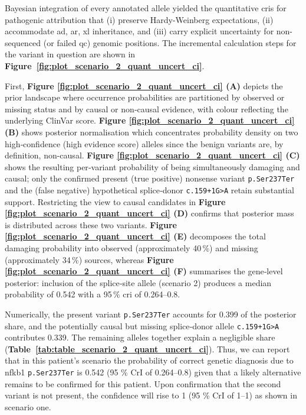 Bayesian integration of every annotated allele yielded the quantitative \ac{cri}s for pathogenic attribution that (i) preserve Hardy-Weinberg expectations, (ii) accommodate \ac{ad}, \ac{ar}, \ac{xl} inheritance, and (iii) carry explicit uncertainty for non-sequenced (or failed \ac{qc}) genomic positions.  
The incremental calculation steps for the variant in question are shown in \textbf{Figure~\ref{fig:plot_scenario_2_quant_uncert_ci}}.

First, \textbf{Figure \ref{fig:plot_scenario_2_quant_uncert_ci} (A)}
depicts the prior landscape where occurrence probabilities are partitioned by observed or missing status and by causal or non‑causal evidence, with colour reflecting the underlying ClinVar score.  
\textbf{Figure \ref{fig:plot_scenario_2_quant_uncert_ci} (B)} shows posterior normalisation which concentrates probability density on two high‑confidence (high evidence score) alleles since the benign variants are, by definition, non-causal.
\textbf{Figure \ref{fig:plot_scenario_2_quant_uncert_ci} (C)} shows the resulting per‑variant probability of being simultaneously damaging and causal; only the confirmed present (true positive) nonsense variant \texttt{p.Ser237Ter} and the (false negative) hypothetical splice‑donor \texttt{c.159+1G{\small\textgreater}A} retain substantial support. 
Restricting the view to causal candidates in 
\textbf{Figure \ref{fig:plot_scenario_2_quant_uncert_ci} (D)} 
confirms that posterior mass is distributed across these two variants. 
\textbf{Figure \ref{fig:plot_scenario_2_quant_uncert_ci} (E)} decomposes the total damaging probability into observed (approximately 40\,\%) and missing (approximately 34\,\%) sources, whereas \textbf{Figure \ref{fig:plot_scenario_2_quant_uncert_ci} (F)} summarises the gene‑level posterior: inclusion of the splice‑site allele (scenario 2) produces a median probability of 0.542 with a 95\,\% \ac{cri} of 0.264–0.8. 

Numerically, the present variant \texttt{p.Ser237Ter} accounts for 0.399 of the posterior share, and the potentially causal but missing splice‑donor allele \texttt{c.159+1G{\small\textgreater}A} contributes 0.339. The remaining alleles together explain a negligible share (\textbf{Table~\ref{tab:table_scenario_2_quant_uncert_ci}}).
Thus, we can report that in this patient's scenario the probability of correct genetic diagnosis due to \ac{nfkb1} \texttt{p.Ser237Ter} is 0.542 (95 \% CrI of 0.264–0.8) given that a likely alternative remains to be confirmed for this patient.
Upon confirmation that the second variant is not present, the confidence will rise to 1 (95 \% CrI of  1–1)  as shown in scenario one.

